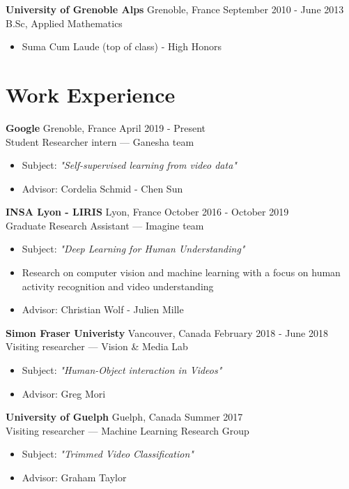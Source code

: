 \documentclass[10pt]{res} %
\begin{document}
\begin{resume}
\textbf{University of Grenoble Alps} \hfill Grenoble, France \hfill September 2010 - June 2013 \\
B.Sc, Applied Mathematics
\begin{itemize}
\item Suma Cum Laude (top of class) - High Honors
\end{itemize}
 

\section{\large Work Experience} 

\textbf{Google} \hfill Grenoble, France \hfill April 2019 - Present \\
Student Researcher intern --- Ganesha team
\begin{itemize}
\item Subject: \textit{"Self-supervised learning from video data"}
\item Advisor: Cordelia Schmid - Chen Sun
\end{itemize}

\textbf{INSA Lyon - LIRIS} \hfill Lyon, France \hfill October 2016 - October 2019 \\
Graduate Research Assistant --- Imagine team
\begin{itemize}
\item Subject: \textit{"Deep Learning for Human Understanding"}
\item Research on computer vision and machine learning with a focus on human activity recognition and video understanding
\item Advisor: Christian Wolf - Julien Mille
\end{itemize}

\textbf{Simon Fraser Univeristy} \hfill Vancouver, Canada \hfill February 2018 - June 2018 \\
Visiting researcher --- Vision \& Media Lab
\begin{itemize}
\item Subject: \textit{"Human-Object interaction in Videos" }
\item Advisor: Greg Mori
\end{itemize}


\textbf{University of Guelph} \hfill Guelph, Canada \hfill Summer 2017 \\
Visiting researcher --- Machine Learning Research Group
\begin{itemize}
\item Subject: \textit{"Trimmed Video Classification"}
\item Advisor: Graham Taylor
\end{itemize}




\end{resume}
\end{document}
